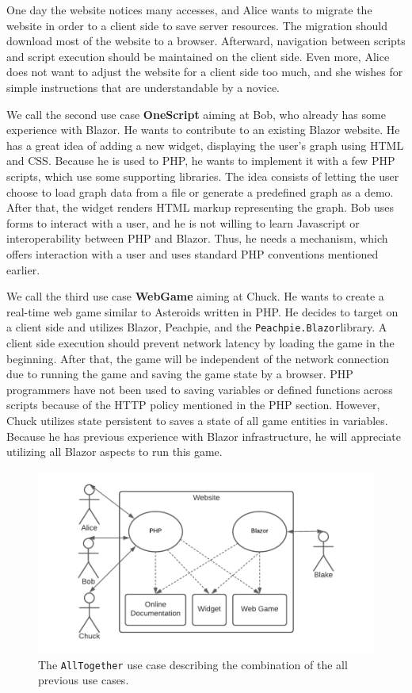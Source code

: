 One day the website notices many accesses, and Alice wants to migrate the website in order to a client side to save server resources.
The migration should download most of the website to a browser.
Afterward, navigation between scripts and script execution should be maintained on the client side.
Even more, Alice does not want to adjust the website for a client side too much, and she wishes for simple instructions that are understandable by a novice.
\par
We call the second use case \textbf{OneScript} aiming at Bob, who already has some experience with Blazor.
He wants to contribute to an existing Blazor website.
He has a great idea of adding a new widget, displaying the user's graph using HTML and CSS.
Because he is used to PHP, he wants to implement it with a few PHP scripts, which use some supporting libraries.
The idea consists of letting the user choose to load graph data from a file or generate a predefined graph as a demo.
After that, the widget renders HTML markup representing the graph.
Bob uses forms to interact with a user, and he is not willing to learn Javascript or interoperability between PHP and Blazor.
Thus, he needs a mechanism, which offers interaction with a user and uses standard PHP conventions mentioned earlier.
\par
We call the third use case \textbf{WebGame} aiming at Chuck.
He wants to create a real-time web game similar to Asteroids written in PHP.
He decides to target on a client side and utilizes Blazor, Peachpie, and the \texttt{Peachpie.Blazor}library.
A client side execution should prevent network latency by loading the game in the beginning.
After that, the game will be independent of the network connection due to running the game and saving the game state by a browser.
PHP programmers have not been used to saving variables or defined functions across scripts because of the HTTP policy mentioned in the PHP section.
However, Chuck utilizes state persistent to saves a state of all game entities in variables.
Because he has previous experience with Blazor infrastructure, he will appreciate utilizing all Blazor aspects to run this game.
\par
\begin{figure}
\centering
\includegraphics[scale=0.8]{./img/UseCaseAllTogether}
\caption{The \texttt{AllTogether} use case describing the combination of the all previous use cases. }
\label{img09:usecase}
\end{figure} 
